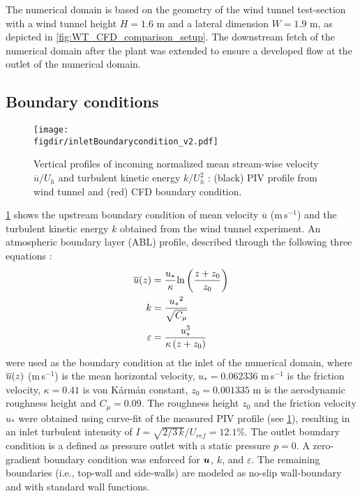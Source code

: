 The numerical domain is based on the geometry of the wind tunnel test-section with a wind tunnel height $H=1.6$ m and a lateral dimension $W=1.9$ m, as depicted in \cref{fig:WT_CFD_comparison_setup}. The downstream fetch of the numerical domain after the plant was extended to ensure a developed flow at the outlet of the numerical domain. %

\subsection{Boundary conditions}

\begin{figure}[t]
	\centering
	\texttt{[image: \\figdir/inletBoundarycondition\_v2.pdf]}
	\caption{Vertical profiles of incoming normalized  mean stream-wise velocity $\overline{u}/U_h$ and   turbulent kinetic energy $k/U_h^2$ : (black) PIV profile from wind tunnel and (red) CFD boundary condition.}
	\label{fig:boundaryprofile}
\end{figure}

\cref{fig:boundaryprofile} shows the upstream boundary condition of mean velocity $\overline{u}$ (m\,s$^{-1}$) and the turbulent kinetic energy $k$ obtained from the wind tunnel experiment. An atmospheric boundary layer (ABL) profile, described through the following three equations \citep{Richards1993}:
\begin{align}
	\overline{u}(z) &= \frac{{{u_*}}}{\kappa }{\text{ln}}\left( {\frac{{z + {z_0}}}{{{z_0}}}} \right) \\
	k &= \frac{{{u_*}^2}}{{\sqrt {{C_\mu }} }} \\
	\varepsilon  &= \frac{{u_*^3}}{{\kappa \left( {z + {z_0}} \right)}}
	\label{eq:ableq}
\end{align}
were used as the boundary condition at the inlet of the numerical domain, where $\overline{u}(z)$ (m\,s$^{-1}$) is the mean horizontal velocity, $u_*= \num{0.062336}$ m\,s$^{-1}$ is  the friction velocity, $\kappa=0.41$ is von K\'arm\'an constant, $z_0 = \num{0.001335}$ m is the aerodynamic roughness height and $C_{\mu}=0.09$. The roughness height $z_0$ and the friction velocity $u_*$ were obtained using curve-fit of the measured PIV profile (see \cref{fig:boundaryprofile}), resulting in an inlet turbulent intensity of $I = \sqrt{2/3\,k}/U_{ref} = 12.1 \%$. The outlet boundary condition is a defined as pressure outlet with a static pressure $p=0$. A zero-gradient boundary condition was enforced for $\textbf{\textit{u}}$, $k$, and $\varepsilon$. The remaining boundaries (i.e., top-wall and side-walls) are modeled as no-slip wall-boundary and with standard wall functions.

